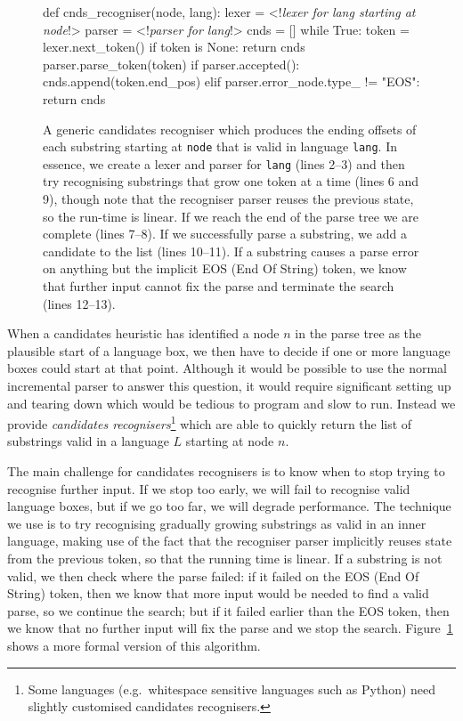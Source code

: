 \documentclass[sigplan,screen]{acmart}\settopmatter{printfolios=true,printccs=false,printacmref=false}
\begin{document}
\begin{figure}
\begin{lstdefault}[]
def cnds_recogniser(node, lang):
  lexer = <!\textrm{\textit{lexer for lang starting at node}}!>
  parser = <!\textrm{\textit{parser for lang}}!>
  cnds = []
  while True:
    token = lexer.next_token()
    if token is None:
      return cnds
    parser.parse_token(token)
    if parser.accepted():
      cnds.append(token.end_pos)
    elif parser.error_node.type_ != "EOS":
        return cnds
\end{lstdefault}
\caption{A generic candidates recogniser which produces the ending offsets of
  each substring starting at \texttt{node} that is valid in language
  \texttt{lang}. In essence, we create a lexer and parser for \texttt{lang}
  (lines 2--3) and then try recognising substrings that grow one token at a
  time (lines 6 and 9), though note that the recogniser parser reuses the previous
  state, so the run-time is linear. If we reach the end of the parse tree we are complete
  (lines 7--8). If we successfully parse a substring, we add a candidate to the
  list (lines 10--11). If a substring causes a parse error on anything but the
  implicit EOS (End Of String) token, we know that further input cannot fix the parse
    and terminate the search (lines 12--13).}
\label{fig:recogniser}
\end{figure}

When a candidates heuristic has identified a node $n$ in the parse tree as the
plausible start of a language box, we then have to decide if one or more
language boxes could start at that point. Although it would be possible to use
the normal incremental parser to answer this question, it would require
significant setting up and tearing down which would be tedious to program and
slow to run. Instead we provide \emph{candidates recognisers}\footnote{Some languages
  (e.g.~whitespace sensitive languages such as Python) need slightly customised
candidates recognisers.} which are able to quickly return the list of substrings valid in
a language $L$ starting at node $n$.

The main challenge for candidates recognisers is to know when to stop trying to recognise
further input. If we stop too early, we will fail to recognise valid language
boxes, but if we go too far, we will degrade performance. The technique
we use is to try recognising gradually growing substrings as valid in an inner
language, making use of the fact that the recogniser parser implicitly
reuses state from the previous token, so that the running time is linear.
If a substring is not valid, we then check where the parse failed:
if it failed on the EOS (End Of String) token, then we know that more input
would be needed to find a valid parse, so we continue the search; but if it
failed earlier than the EOS token, then we know that no further input will
fix the parse and we stop the search. Figure~\ref{fig:recogniser} shows a
more formal version of this algorithm.
\end{document}
